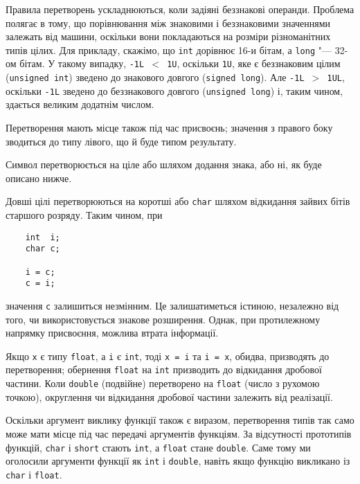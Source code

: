 \documentclass[a4paper,12pt]{book}
\begin{document}
  Правила перетворень ускладнюються, коли задіяні беззнакові операнди. Проблема полягає в
  тому, що порівнювання між знаковими і беззнаковими значеннями залежать від машини,
  оскільки вони покладаються на розміри різноманітних типів цілих. Для прикладу, скажімо,
  що \texttt{int} дорівнює 16-и бітам, а \texttt{long} "--- 32-ом бітам. У такому
  випадку, \texttt{-1L \mbox{$<$} 1U}, оскільки \texttt{1U}, яке є беззнаковим цілим
  (\texttt{unsigned int}) зведено до знакового довгого (\texttt{signed long}). Але \texttt{-1L
  \mbox{$>$} 1UL}, оскільки \texttt{-1L} зведено до беззнакового довгого (\texttt{unsigned
  long}) і, таким чином, здається великим додатнім числом.

  Перетворення мають місце також під час присвоєнь; значення з правого боку зводиться до
  типу лівого, що й буде типом результату.

  Символ перетворюється на ціле або шляхом додання знака, або ні, як буде описано нижче.

  Довші цілі перетворюються на коротші або \texttt{char} шляхом відкидання зайвих бітів
  старшого розряду. Таким чином, при
  \begin{verbatim}
    int  i;
    char c;

    i = c;
    c = i;
  \end{verbatim}
  значення \texttt{c} залишиться незмінним. Це залишатиметься істиною, незалежно від того,
  чи використовується знакове розширення. Однак, при протилежному напрямку присвоєння,
  можлива втрата інформації.

  Якщо \texttt{x} є типу \texttt{float}, а \texttt{i} є \texttt{int}, тоді \texttt{x = i}
  та \texttt{i = x}, обидва, призводять до перетворення; обернення \texttt{float} на
  \texttt{int} призводить до відкидання дробової частини. Коли \texttt{double} (подвійне)
  перетворено на \texttt{float} (число з рухомою точкою), округлення чи відкидання
  дробової частини залежить від реалізації.

  Оскільки аргумент виклику функції також є виразом, перетворення типів так само може мати
  місце під час передачі аргументів функціям. За відсутності прототипів функцій,
  \texttt{char} і \texttt{short} стають \texttt{int}, а \texttt{float} стане
  \texttt{double}. Саме тому ми оголосили аргументи функції як \texttt{int} і
  \texttt{double}, навіть якщо функцію викликано із \texttt{char} і \texttt{float}.
\end{document}
